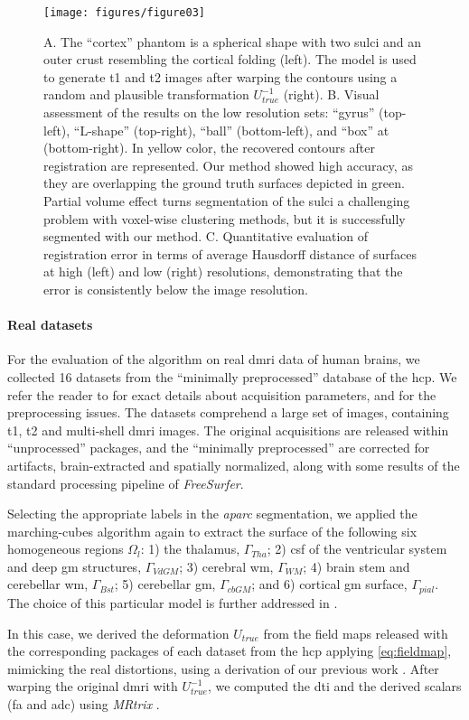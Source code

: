 \begin{figure*}
	\texttt{[image: figures/figure03]}
	\caption{A. The ``cortex'' phantom is a spherical shape with two sulci and an
	  outer crust resembling the cortical folding (left).
	The model is used to generate \gls*{t1} and \gls*{t2} images after warping the
	  contours using a random and plausible transformation $U_{true}^{-1}$ (right).
	B. Visual assessment of the results on the low resolution sets:
	  ``gyrus'' (top-left), ``L-shape'' (top-right), ``ball'' (bottom-left),
	  and ``box'' at (bottom-right).
	In yellow color, the recovered contours after registration are represented.
	Our method showed high accuracy, as they are overlapping the ground truth surfaces
	  depicted in green.
	Partial volume effect turns segmentation of the sulci a challenging problem with voxel-wise
	  clustering methods, but it is successfully segmented with our method.
	C. Quantitative evaluation of registration error in terms of average Hausdorff distance of
	  surfaces at high (left) and low (right) resolutions, demonstrating that the error is
	  consistently below the image resolution.
	  }\label{fig:phantom}
\end{figure*}

\paragraph*{Real datasets} %
\label{sec:human_connectome}
%
For the evaluation of the algorithm on real \gls*{dmri} data of human brains,
  we collected 16 datasets from the ``minimally preprocessed''
	 database of the \gls*{hcp}.
We refer the reader to \citep{essen_human_2012} for exact details about acquisition
  parameters, and \citep{glasser_minimal_2013} for the preprocessing issues.
The datasets comprehend a large set of images, containing \gls*{t1}, \gls*{t2} and
  multi-shell \gls*{dmri} images.
The original acquisitions are released within ``unprocessed'' packages, and
  the ``minimally preprocessed'' are corrected for artifacts, brain-extracted
  and spatially normalized, along with some results of the standard processing
  pipeline of \emph{FreeSurfer}.

Selecting the appropriate labels in the \emph{aparc} segmentation, we applied
  the marching-cubes algorithm again to extract the surface of the following
  six homogeneous regions $\Omega_l$:
  1) the thalamus, $\Gamma_{Tha}$;
  2) \gls*{csf} of the ventricular system and deep \gls*{gm} structures, $\Gamma_{VdGM}$;
  3) cerebral \gls*{wm}, $\Gamma_{WM}$;
  4) brain stem and cerebellar \gls*{wm}, $\Gamma_{Bst}$;
	5) cerebellar \gls*{gm}, $\Gamma_{cbGM}$; and
	6) cortical \gls*{gm} surface, $\Gamma_{pial}$.
The choice of this particular model is further addressed in .

In this case, we derived the deformation $U_{true}$ from the field maps released with
  the corresponding packages of each dataset from the \gls*{hcp} applying \eqref{eq:fieldmap},
  mimicking the real distortions, using a derivation of our previous work
  \citep{esteban_simulationbased_2014}.
After warping the original \gls*{dmri} with $U_{true}^{-1}$, we computed the \gls*{dti} and
  the derived scalars (\gls*{fa} and \gls*{adc}) using \emph{MRtrix} \citep{tournier_mrtrix_2012}.